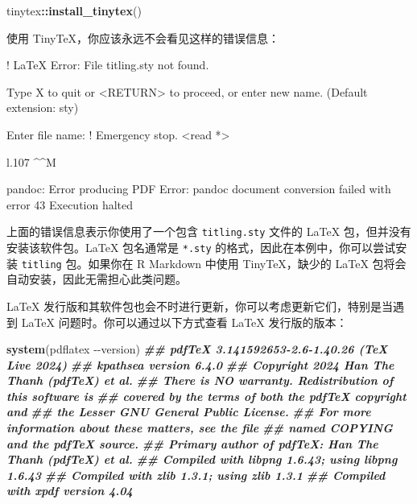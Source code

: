\documentclass[
  12pt,
]{krantz}
\newenvironment{Shaded}{\begin{snugshade}}{\end{snugshade}}
\newcommand{\DocumentationTok}[1]{\textcolor[rgb]{0.56,0.35,0.01}{\textbf{\textit{#1}}}}
\newcommand{\FunctionTok}[1]{\textcolor[rgb]{0.13,0.29,0.53}{\textbf{#1}}}
\newcommand{\NormalTok}[1]{#1}
\newcommand{\SpecialCharTok}[1]{\textcolor[rgb]{0.81,0.36,0.00}{\textbf{#1}}}
\newcommand{\StringTok}[1]{\textcolor[rgb]{0.31,0.60,0.02}{#1}}
\theoremstyle{definition}
\theoremstyle{definition}
\theoremstyle{definition}
\theoremstyle{definition}
\theoremstyle{remark}
\begin{document}
\begin{Shaded}
\begin{Highlighting}[]
\NormalTok{tinytex}\SpecialCharTok{::}\FunctionTok{install\_tinytex}\NormalTok{()}
\end{Highlighting}
\end{Shaded}

使用 TinyTeX，你应该永远不会看见这样的错误信息：

\begin{Shaded}
\begin{Highlighting}[]
\NormalTok{! LaTeX Error: File \textasciigrave{}titling.sty\textquotesingle{} not found.}

\NormalTok{Type X to quit or \textless{}RETURN\textgreater{} to proceed,}
\NormalTok{or enter new name. (Default extension: sty)}

\NormalTok{Enter file name: }
\NormalTok{! Emergency stop.}
\NormalTok{\textless{}read *\textgreater{} }
         
\NormalTok{l.107 \^{}\^{}M}

\NormalTok{pandoc: Error producing PDF}
\NormalTok{Error: pandoc document conversion failed with error 43}
\NormalTok{Execution halted}
\end{Highlighting}
\end{Shaded}

上面的错误信息表示你使用了一个包含 \texttt{titling.sty} 文件的 LaTeX 包，但并没有安装该软件包。LaTeX 包名通常是 \texttt{*.sty} 的格式，因此在本例中，你可以尝试安装 \texttt{titling} 包。如果你在 R Markdown 中使用 TinyTeX，缺少的 LaTeX 包将会自动安装，因此无需担心此类问题。

LaTeX 发行版和其软件包也会不时进行更新，你可以考虑更新它们，特别是当遇到 LaTeX 问题时。你可以通过以下方式查看 LaTeX 发行版的版本：

\begin{Shaded}
\begin{Highlighting}[]
\FunctionTok{system}\NormalTok{(}\StringTok{\textquotesingle{}pdflatex {-}{-}version\textquotesingle{}}\NormalTok{)}
\DocumentationTok{\#\#  pdfTeX 3.141592653{-}2.6{-}1.40.26 (TeX Live 2024)}
\DocumentationTok{\#\#  kpathsea version 6.4.0}
\DocumentationTok{\#\#  Copyright 2024 Han The Thanh (pdfTeX) et al.}
\DocumentationTok{\#\#  There is NO warranty.  Redistribution of this software is}
\DocumentationTok{\#\#  covered by the terms of both the pdfTeX copyright and}
\DocumentationTok{\#\#  the Lesser GNU General Public License.}
\DocumentationTok{\#\#  For more information about these matters, see the file}
\DocumentationTok{\#\#  named COPYING and the pdfTeX source.}
\DocumentationTok{\#\#  Primary author of pdfTeX: Han The Thanh (pdfTeX) et al.}
\DocumentationTok{\#\#  Compiled with libpng 1.6.43; using libpng 1.6.43}
\DocumentationTok{\#\#  Compiled with zlib 1.3.1; using zlib 1.3.1}
\DocumentationTok{\#\#  Compiled with xpdf version 4.04}
\end{Highlighting}
\end{Shaded}
\end{document}

